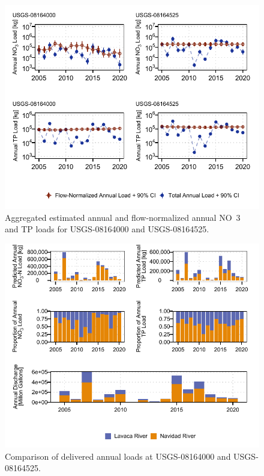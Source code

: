 \documentclass[water,article,submit,oneauthor]{Definitions/mdpi}
\begin{document}
\begin{figure}[H]

{\centering \includegraphics[width=1\linewidth]{Schramm-Manuscript-2023_files/figure-latex/fig3-1} 

}

\caption[Aggregated estimated annual and flow-normalized annual NO~3~ and TP loads for USGS-08164000 and USGS-08164525]{Aggregated estimated annual and flow-normalized annual NO~3~ and TP loads for USGS-08164000 and USGS-08164525.}\label{fig:fig3}
\end{figure}

\begin{figure}[H]

{\centering \includegraphics[width=1\linewidth]{Schramm-Manuscript-2023_files/figure-latex/fig4-1} 

}

\caption[Comparison of delivered annual loads at USGS-08164000 and USGS-08164525]{Comparison of delivered annual loads at USGS-08164000 and USGS-08164525.}\label{fig:fig4}
\end{figure}
\end{document}
